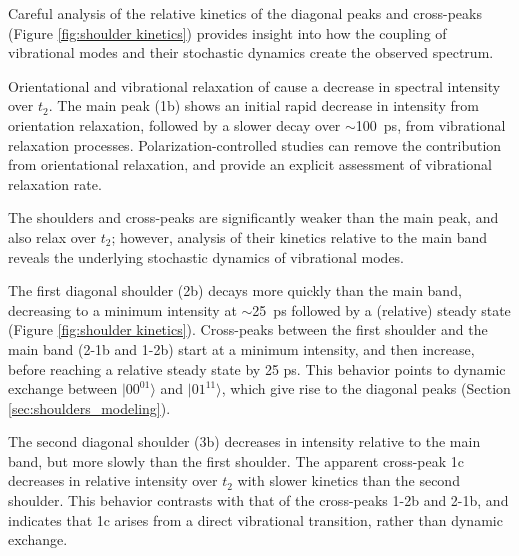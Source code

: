 Careful analysis of the relative kinetics of the diagonal peaks and cross-peaks (Figure \ref{fig:shoulder kinetics}) provides insight into how the coupling of  vibrational modes and their stochastic dynamics create the observed spectrum.

Orientational and vibrational relaxation of  cause a decrease in spectral intensity over $t_2$. The main peak (1b) shows an initial rapid decrease in intensity from orientation relaxation, followed by a slower decay over $\sim$\SI{100}{\ps}, from vibrational relaxation processes. Polarization-controlled studies can remove the contribution from orientational relaxation, and provide an explicit assessment of vibrational relaxation rate.\cite{hammzanni-11,Hochstrasser2001}

The shoulders and cross-peaks are significantly weaker than the main peak, and also relax over $t_2$; however, analysis of their kinetics relative to the main band reveals the underlying stochastic dynamics of  vibrational modes.

The first diagonal shoulder (2b) decays more quickly than the main band, decreasing to a minimum intensity at $\sim$\SI{25}{\ps} followed by a (relative) steady state (Figure \ref{fig:shoulder kinetics}). Cross-peaks between the first shoulder and the main band (2-1b and 1-2b) start at a minimum intensity, and then increase, before reaching a relative steady state by 25 ps. This behavior points to dynamic exchange between $|00^01\rangle$ and $|01^11\rangle$, which give rise to the diagonal peaks (Section \ref{sec:shoulders_modeling}).

The second diagonal shoulder (3b) decreases in intensity relative to the main band, but more slowly than the first shoulder. The apparent cross-peak 1c decreases in relative intensity over $t_2$ with slower kinetics than the second shoulder. This behavior contrasts with that of the cross-peaks 1-2b and 2-1b, and indicates that 1c arises from a direct vibrational transition, rather than dynamic exchange.


